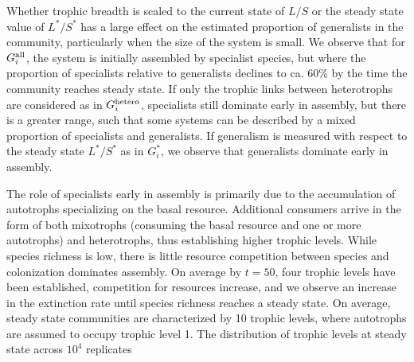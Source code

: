 \documentclass[twocolumn,preprintnumbers,amsmath,amssymb,superscriptaddress]{revtex4}
\newcommand{\rr}[1]{{\rm #1}}
\begin{document}
Whether trophic breadth is scaled to the current state of $L/S$ or the steady state value of $L^*/S^*$ has a large effect on the estimated proportion of generalists in the community, particularly when the size of the system is small.
We observe that for $G_i^{\rr{all}}$, the system is initially assembled by specialist species, but where the proportion of specialists relative to generalists declines to ca. 60\% by the time the community reaches steady state.
If only the trophic links between heterotrophs are considered as in $G_i^{\rr{hetero}}$, specialists still dominate early in assembly, but there is a greater range, such that some systems can be described by a mixed proportion of specialists and generalists.
If generalism is measured with respect to the steady state $L^*/S^*$ as in $G_i^*$, we observe that generalists dominate early in assembly.

The role of specialists early in assembly is primarily due to the accumulation of autotrophs specializing on the basal resource.
Additional consumers arrive in the form of both mixotrophs (consuming the basal resource and one or more autotrophs) and heterotrophs, thus establishing higher trophic levels.
While species richness is low, there is little resource competition between species and colonization dominates assembly.
On average by $t=50$, four trophic levels have been established, competition for resources increase, and we observe an increase in the extinction rate until species richness reaches a steady state.
On average, steady state communities are characterized by 10 trophic levels, where autotrophs are assumed to occupy trophic level 1.
The distribution of trophic levels at steady state across $10^4$ replicates


\end{document}
